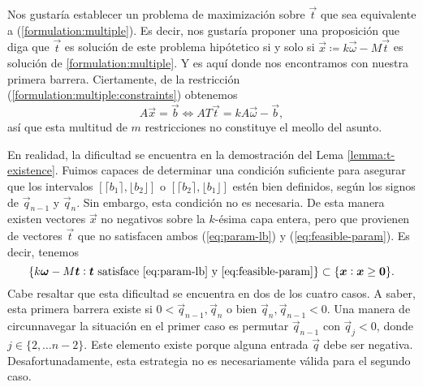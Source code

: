 Nos gustaría establecer un problema de maximización sobre $\vec{t}$ que sea equivalente a
(\ref{formulation:multiple}). Es decir, nos gustaría proponer una proposición que diga que $\vec{t}$
es solución de este problema hipótetico si y solo si $\vec{x} \coloneq k\vec{\omega} - M\vec{t}$ es
solución de \ref{formulation:multiple}. Y es aquí donde nos encontramos con nuestra primera barrera.
Ciertamente, de la restricción (\ref{formulation:multiple:constraints}) obtenemos
\begin{equation*}
	A\vec{x} = \vec{b} \iff AT\vec{t} = kA\vec{\omega} - \vec{b},
\end{equation*}
así que esta multitud de $m$ restricciones no constituye el meollo del asunto.

En realidad, la dificultad se encuentra en la demostración del Lema \ref{lemma:t-existence}. Fuimos
capaces de determinar una condición suficiente para asegurar que los intervalos $[\lceil b_1 \rceil,
\lfloor b_2 \rfloor]$ o $[\lceil b_2 \rceil, \lfloor b_1 \rfloor]$ estén bien definidos, según los
signos de $\vec{q}_{n-1}$ y $\vec{q}_n$. Sin embargo, esta condición no es necesaria. De esta manera
existen vectores $\vec{x}$ no negativos sobre la $k$-ésima capa entera, pero que provienen de
vectores $\vec{t}$ que no satisfacen ambos (\ref{eq:param-lb}) y (\ref{eq:feasible-param}). Es
decir, tenemos
\begin{equation}
	\label{eq:multiple:strict-subset}
	\lbrace k\vec{\omega} - M\vec{t} \vcentcolon \vec{t} ~\text{satisface \ref{eq:param-lb} y
	\ref{eq:feasible-param}} \rbrace
	\subset \lbrace \vec{x} \vcentcolon \vec{x} \geq \vec{0} \rbrace.
\end{equation}
Cabe resaltar que esta dificultad se encuentra en dos de los cuatro casos. A saber, esta primera
barrera existe si $0 < \vec{q}_{n - 1}, \vec{q}_n$ o bien $\vec{q}_n,\vec{q}_{n-1} < 0$. Una
manera de circunnavegar la situación en el primer caso es permutar $\vec{q}_{n-1}$ con $\vec{q}_j <
0$, donde $j \in \lbrace 2, \ldots n - 2\rbrace$. Este elemento existe porque alguna entrada
$\vec{q}$ debe ser negativa. Desafortunadamente, esta estrategia no es necesariamente válida para el
segundo caso.

